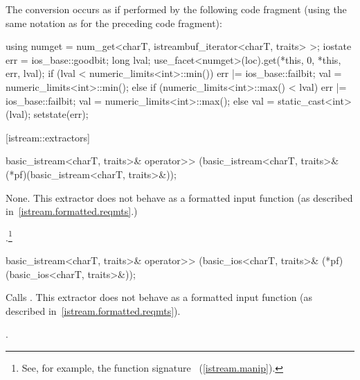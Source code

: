 \begin{itemdescr}
\pnum
The conversion occurs as if performed by the following code fragment
(using the same notation as for the preceding code fragment):
\begin{codeblock}
using numget = num_get<charT, istreambuf_iterator<charT, traits> >;
iostate err = ios_base::goodbit;
long lval;
use_facet<numget>(loc).get(*this, 0, *this, err, lval);
if (lval < numeric_limits<int>::min()) {
  err |= ios_base::failbit;
  val = numeric_limits<int>::min();
} else if (numeric_limits<int>::max() < lval) {
  err |= ios_base::failbit;
  val = numeric_limits<int>::max();
}  else
  val = static_cast<int>(lval);
setstate(err);
\end{codeblock}
\end{itemdescr}

[istream::extractors]{}

%
%
\begin{itemdecl}
basic_istream<charT, traits>& operator>>
    (basic_istream<charT, traits>& (*pf)(basic_istream<charT, traits>&));
\end{itemdecl}

\begin{itemdescr}
\pnum
\effects
None.
This extractor does not behave as a formatted input function
(as described in~\ref{istream.formatted.reqmts}.)

\pnum
\returns
{}.\footnote{See, for example, the function signature
~(\ref{istream.manip}).%
}
\end{itemdescr}

%
%
\begin{itemdecl}
basic_istream<charT, traits>& operator>>
    (basic_ios<charT, traits>& (*pf)(basic_ios<charT, traits>&));
\end{itemdecl}

\begin{itemdescr}
\pnum
\effects
Calls
.
This extractor does not behave as a formatted input function
(as described in~\ref{istream.formatted.reqmts}).

\pnum
\returns
{}.
\end{itemdescr}

